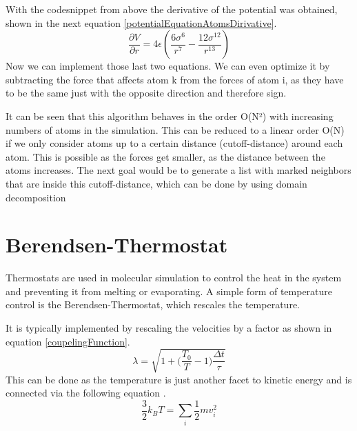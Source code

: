 With the codesnippet from above the derivative of the potential was obtained, shown in the next equation \ref{potentialEquationAtomsDirivative}.
\begin{equation}
	\label{potentialEquationAtomsDirivative}
	\frac{\partial V}{\partial r} = 4 \epsilon \left(\frac{6 \sigma^{6}}{r^{7}} - \frac{12 \sigma^{12}}{r^{13}}\right)
\end{equation}
Now we can implement those last two equations. We can even optimize it by subtracting the force that affects atom k from the forces of atom i, as they have to be the same just with the opposite direction and therefore sign. 
\par 
It can be seen that this algorithm behaves in the order O(N²) with increasing numbers of atoms in the simulation. This can be reduced to a linear order O(N) if we only consider atoms up to a certain distance (cutoff-distance) around each atom. This is possible as the forces get smaller, as the distance between the atoms increases. The next goal would be to generate a list with marked neighbors that are inside this cutoff-distance, which can be done by using domain decomposition \cite[cf.][]{molDymCourse}
\section{Berendsen-Thermostat}
\begin{comment}
- couple the moleclular system to a larger heat bath
- thermostat controls the heat of the simulation so the system does not melt or evaporate
\end{comment}
Thermostats are used in molecular simulation to control the heat in the system and preventing it from melting or evaporating. A simple form of temperature control is the Berendsen-Thermostat, which rescales the temperature. 
\par
It is typically implemented by rescaling the velocities by a factor as shown in equation \ref{coupelingFunction}. 
\begin{equation}
	\label{coupelingFunction}
	\lambda = \sqrt{1 + \bigg(\frac{T_{0}}{T} -1\bigg)\frac{\Delta t}{\tau}}
\end{equation}
This can be done as the temperature is just another facet to kinetic energy and is connected via the following equation \cite[cf.][]{molDymCourse}. 
\begin{equation}
	\label{bolzmann}
	\frac{3}{2} k_{B} T = \sum_{i} \frac{1}{2} m v_{i}^2
\end{equation}

